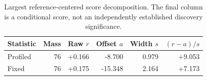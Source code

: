 \begin{table}[H]\centering\small
\begin{tabular}{lrrrrr}\toprule
Statistic & Mass & Raw $r$ & Offset $a$ & Width $s$ & $(r-a)/s$\\\midrule
Profiled & 76 & +0.166 & -8.700 & 0.979 & +9.053 \\
Fixed & 76 & +0.175 & -15.348 & 2.164 & +7.173 \\
\bottomrule\end{tabular}
\caption{Largest reference-centered score decomposition. The final column is a conditional score, not an independently established discovery significance.}\end{table}

